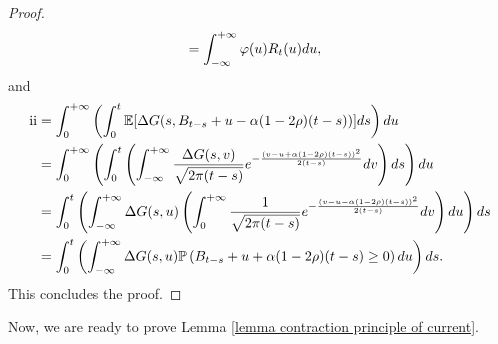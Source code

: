 \documentclass[reqno,11pt]{amsart}
\numberwithin{equation}{section}
\begin{document}
\begin{proof}
\begin{align}
			&=\int_{-\infty}^{+\infty}\varphi (u)R_t(u)du \notag,
		\end{align}
		and 
		\begin{align}\label{equ appendix C2}
			{\rm \uppercase\expandafter{\romannumeral2}}&=\int_0^{+\infty}\left(\int_0^t\mathbb{E} [\Delta G (s, B_{t-s}+u-\alpha(1-2\rho)(t-s)) ] ds\right)du
			\notag\\
			&=\int_0^{+\infty}\left(\int_0^t\left(\int_{-\infty}^{+\infty}\frac{\Delta G (s,v)}{\sqrt{2\pi(t-s)}}e^{-\frac{(v-u+\alpha(1-2\rho)(t-s))^2}{2(t-s)}}dv\right)ds\right)du \\
			&=\int_0^t\left(\int_{-\infty}^{+\infty}\Delta G (s,u)\left(\int_0^{+\infty}\frac{1}{\sqrt{2\pi(t-s)}}e^{-\frac{(v-u-\alpha(1-2\rho)(t-s))^2}{2(t-s)}}dv\right)du\right)ds\notag\\
			&=\int_0^t\left(\int_{-\infty}^{+\infty}\Delta G (s,u)\mathbb{P}\left(B_{t-s}+u+\alpha(1-2\rho)(t-s)\geq 0\right)du\right)ds. \notag
		\end{align}
		This concludes the proof.
	\end{proof}


Now, we are ready to prove Lemma \ref{lemma contraction principle of current}. 
\end{document}
